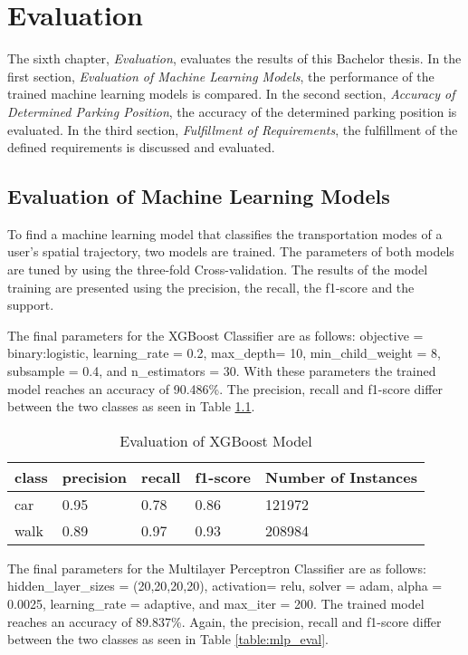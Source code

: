\chapter{Evaluation}
The sixth chapter, \textit{Evaluation}, evaluates the results of this Bachelor thesis. In the first section,  
\textit{Evaluation of Machine Learning Models}, the performance of the trained machine learning models is compared. In the second section, \textit{Accuracy of Determined Parking Position}, the accuracy of the determined parking position is evaluated. In the third section, \textit{Fulfillment of Requirements}, the fulfillment of the defined requirements is discussed and evaluated.

\section{Evaluation of Machine Learning Models}
To find a machine learning model that classifies the transportation modes of a user's spatial trajectory, two models are trained. The parameters of both models are tuned by using the three-fold Cross-validation. The results of the model training are presented using the precision, the recall, the f1-score and the support.

The final parameters for the XGBoost Classifier are as follows: \linebreak objective = binary:logistic, learning\_rate = 0.2, max\_depth= 10, min\_child\_weight = 8, subsample = 0.4, and n\_estimators = 30. With these parameters the trained model reaches an accuracy of 90.486\%. The precision, recall and f1-score differ 
between the two classes as seen in Table \ref{table:xgb_eval}. 

\begin{table}[h!]
    \centering
    \begin{tabular}{|l|l|l|l|l|} \toprule
        class & precision & recall & f1-score & Number of Instances \\ \midrule
        car & 0.95 & 0.78 & 0.86 & 121972 \\
        walk & 0.89 & 0.97 & 0.93 & 208984 \\ \bottomrule 
    \end{tabular}
    \caption{Evaluation of XGBoost Model}
    \label{table:xgb_eval}
\end{table}{}

The final parameters for the Multilayer Perceptron Classifier are as follows: \linebreak hidden\_layer\_sizes =  (20,20,20,20), activation= relu, solver = adam, alpha = 0.0025, learning\_rate = adaptive, and max\_iter = 200. The trained model reaches an accuracy of 89.837\%. Again, the  precision, recall and f1-score differ between the two classes as seen in Table \ref{table:mlp_eval}.


